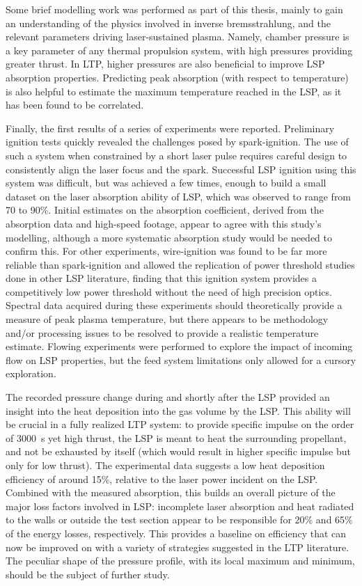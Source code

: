     Some brief modelling work was performed as part of this thesis, mainly to gain an understanding of the physics involved in inverse bremsstrahlung, and the relevant parameters driving laser-sustained plasma. Namely, chamber pressure is a key parameter of any thermal propulsion system, with high pressures providing greater thrust. In LTP, higher pressures are also beneficial to improve LSP absorption properties. Predicting peak absorption (with respect to temperature) is also helpful to estimate the maximum temperature reached in the LSP, as it has been found to be correlated.

    Finally, the first results of a series of experiments were reported. Preliminary ignition tests quickly revealed the challenges posed by spark-ignition. The use of such a system when constrained by a short laser pulse requires careful design to consistently align the laser focus and the spark. Successful LSP ignition using this system was difficult, but was achieved a few times, enough to build a small dataset on the laser absorption ability of LSP, which was observed to range from 70 to 90\%. Initial estimates on the absorption coefficient, derived from the absorption data and high-speed footage, appear to agree with this study's modelling, although a more systematic absorption study would be needed to confirm this. For other experiments, wire-ignition was found to be far more reliable than spark-ignition and allowed the replication of power threshold studies done in other LSP literature, finding that this ignition system provides a competitively low power threshold without the need of high precision optics. Spectral data acquired during these experiments should theoretically provide a measure of peak plasma temperature, but there appears to be methodology and/or processing issues to be resolved to provide a realistic temperature estimate. Flowing experiments were performed to explore the impact of incoming flow on LSP properties, but the feed system limitations only allowed for a cursory exploration.
    
    The recorded pressure change during and shortly after the LSP provided an insight into the heat deposition into the gas volume by the LSP. This ability will be crucial in a fully realized LTP system: to provide specific impulse on the order of \qty{3000}{s} yet high thrust, the LSP is meant to heat the surrounding propellant, and not be exhausted by itself (which would result in higher specific impulse but only for low thrust). The experimental data suggests a low heat deposition efficiency of around 15\%, relative to the laser power incident on the LSP. Combined with the measured absorption, this builds an overall picture of the major loss factors involved in LSP: incomplete laser absorption and heat radiated to the walls or outside the test section appear to be responsible for 20\% and 65\% of the energy losses, respectively. This provides a baseline on efficiency that can now be improved on with a variety of strategies suggested in the LTP literature. The peculiar shape of the pressure profile, with its local maximum and minimum, should be the subject of further study.

